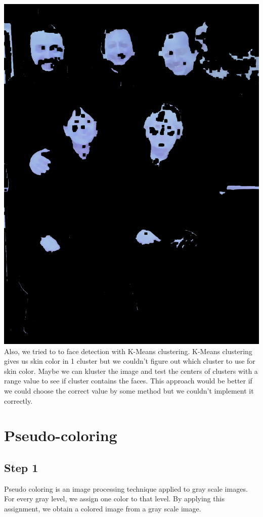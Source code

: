 \documentclass[conference]{IEEEtran}
\begin{document}
\includegraphics[scale=0.05]{erosion.jpg} \\

Also, we tried to to face detection with K-Means clustering. K-Means clustering gives us skin color in 1 cluster but we couldn't figure out which cluster to use for skin color. Maybe we can kluster the image and test the centers of clusters with a range value to see if cluster contains the faces. This approach would be better if we could choose the correct value by some method but we couldn't implement it correctly.

\section{Pseudo-coloring}
\subsection{Step 1}
Pseudo coloring is an image processing technique applied to gray scale images. For every gray level, we assign one color to that level. By applying this assignment, we obtain a colored image from a gray scale image. 
\end{document}
